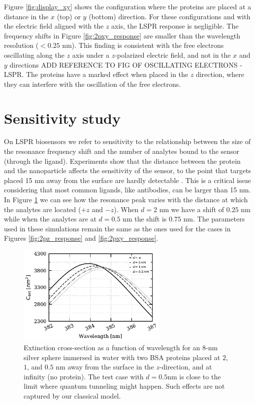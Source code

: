 Figure \ref{fig:display_xy} shows the configuration where the proteins are placed at a 
distance in the $x$ (top) or $y$ (bottom) direction. For these configurations and with 
the electric field aligned with the $z$ axis, the LSPR response is negligible. The 
frequency shifts in Figure \ref{fig:2pxy_response} are smaller than the wavelength 
resolution ($<0.25$ nm). This finding is consistent with the free electrons oscillating
along the $z$ axis under a $z$-polarized electric field, and not in the $x$ and $y$ 
directions {\color{red} ADD REFERENCE TO FIG OF OSCILLATING ELECTRONS - LSPR}. The 
proteins have a marked effect when placed in the $z$ direction, where they can interfere 
with the oscillation of the free electrons. 

\section{Sensitivity study} \label{sec:sensitivity}

On LSPR biosensors we refer to sensitivity to the relationship between the size of the 
resonance frequency shift and the number of analytes bound to the sensor (through the 
ligand). Experiments show that the distance between the protein and the nanoparticle 
affects the sensitivity of the sensor, to the point that targets placed 15 nm away 
from the surface are hardly detectable \cite{HaesETal2004}. This is a critical issue
considering that most common ligands, like antibodies, can be larger than 15 nm. In 
Figure \ref{fig:dist_response} we can see how the resonance peak varies with the distance 
at which the  analytes are located ($+z$ and $-z$). When $d=2$ nm we have a shift of 
$0.25$ nm while when the analytes are at $d=0.5$ nm the shift is $0.75$ nm. The parameters
used in these simulations remain the same as the ones used for the cases in Figures 
\ref{fig:2pz_response} and \ref{fig:2pxy_response}.

\begin{figure}%
   \centering
   \includegraphics[width=0.65\textwidth]{2pz_lspr_response.pdf} 
   \caption{Extinction cross-section as a function of wavelength for an $8$-nm
            silver sphere immersed in water with two BSA proteins placed at
            $2$, $1$, and $0.5$ nm away from the surface in the 
            $z$-direction, and at infinity (no protein). The test case with
            $d=0.5$nm is close to the limit where quantum tunneling might happen. 
            Such effects are not captured by our classical model.}
   \label{fig:dist_response}
\end{figure}

